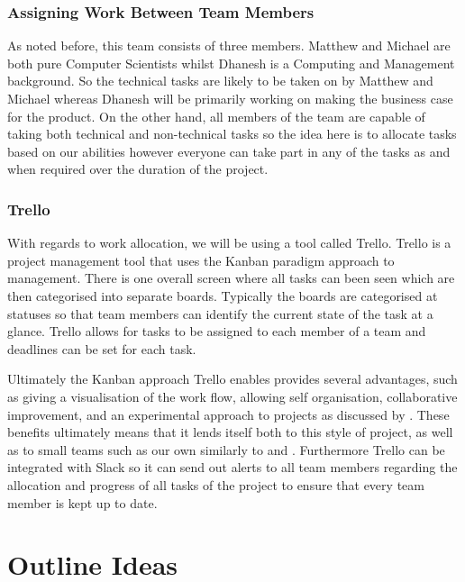 \documentclass{article}
\begin{document}
\subsubsection{Assigning Work Between Team Members}
As noted before, this team consists of three members. Matthew and Michael are both pure Computer Scientists whilst Dhanesh is a Computing and Management background. So the technical tasks are likely to be taken on by Matthew and Michael whereas Dhanesh will be primarily working on making the business case for the product. On the other hand, all members of the team are capable of taking both technical and non-technical tasks so the idea here is to allocate tasks based on our abilities however everyone can take part in any of the tasks as and when required over the duration of the project.
\subsubsection{Trello}
With regards to work allocation, we will be using a tool called Trello. Trello is a project management tool that uses the Kanban paradigm approach to management. There is one overall screen where all tasks can been seen which are then categorised into separate boards. Typically the boards are categorised at statuses so that team members can identify the current state of the task at a glance. Trello allows for tasks to be assigned to each member of a team and deadlines can be set for each task.
\par
Ultimately the Kanban approach Trello enables provides several advantages, such as giving a visualisation of the work flow, allowing self organisation, collaborative improvement, and an experimental approach to projects as discussed by \textcite{anderson2010kanban}. These benefits ultimately means that it lends itself both to this style of project, as well as to small teams such as our own similarly to \textcite{kanbanforasmallteam} and \textcite{whenkanbanworksbest}. Furthermore Trello can be integrated with Slack so it can send out alerts to all team members regarding the allocation and progress of all tasks of the project to ensure that every team member is kept up to date.

\section{Outline Ideas}
\end{document}
